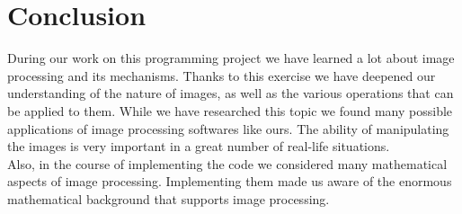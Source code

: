 \documentclass[a4paper,12pt]{article}
\begin{document}
\section{Conclusion}

During our work on this programming project we have learned a lot about image processing and its mechanisms. Thanks to this exercise we have deepened our understanding of the nature of images, as well as the various operations that can be applied to them. While we have researched this topic we found many possible applications of image processing softwares like ours. The ability of manipulating the images is very important in a great number of real-life situations. \\
Also, in the course of implementing the code we considered many mathematical aspects of image processing. Implementing them made us aware of the enormous mathematical background that supports image processing.
\end{document}
